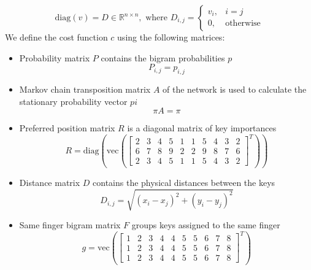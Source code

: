 \documentclass[9pt,twocolumn,twoside]{pnas-report}
\begin{document}
{\begin{equation}
    \text{diag}(v) = D \in \mathbb{R}^{n \times n}, \text{ where } D_{i,j} = \begin{cases}
        v_i, & i = j\\
        0, & \text{otherwise}
    \end{cases}
\end{equation}
We define the cost function $c$ using the following matrices:
\begin{itemize}
    \item Probability matrix $P$ contains the bigram probabilities $p$
    \begin{equation}
        P_{i,j} = p_{i,j}
    \end{equation}
    \item Markov chain transposition matrix $A$ of the network is used to calculate the stationary probability vector $pi$
    \begin{equation}
        \pi A = \pi
    \end{equation}
    \item Preferred position matrix $R$ is a diagonal matrix of key importances
    \begin{equation}
        R = \text{diag}\left(\text{vec}\left(
        \begin{bmatrix}
            2 & 3 & 4 & 5 & 1 & 1 & 5 & 4 & 3 & 2\\
            6 & 7 & 8 & 9 & 2 & 2 & 9 & 8 & 7 & 6\\
            2 & 3 & 4 & 5 & 1 & 1 & 5 & 4 & 3 & 2
        \end{bmatrix}^T\right)\right)
    \end{equation}
    \item Distance matrix $D$ contains the physical distances between the keys
    \begin{equation}
        D_{i,j} = \sqrt{(x_i - x_j)^2 + (y_i - y_j)^2}
    \end{equation}
    \item Same finger bigram matrix $F$ groups keys assigned to the same finger
    \begin{equation}
        g = \text{vec}\left(
        \begin{bmatrix}
            1 & 2 & 3 & 4 & 4 & 5 & 5 & 6 & 7 & 8\\
            1 & 2 & 3 & 4 & 4 & 5 & 5 & 6 & 7 & 8\\
            1 & 2 & 3 & 4 & 4 & 5 & 5 & 6 & 7 & 8
        \end{bmatrix}^T\right)

\end{equation}
\end{itemize}}
\end{document}
